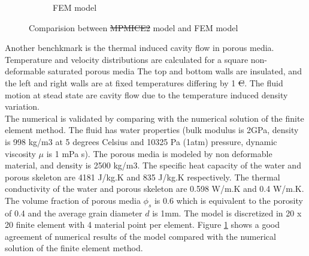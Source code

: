 \documentclass[preprint,12pt]{elsarticle}
\providecommand{\DIFadd}[1]{{\protect\color{blue}\uwave{#1}}} %
\providecommand{\DIFdel}[1]{{\protect\color{red}\sout{#1}}}                      %
\providecommand{\DIFaddbegin}{} %
\providecommand{\DIFaddend}{} %
\providecommand{\DIFdelbegin}{} %
\providecommand{\DIFdelend}{} %
\providecommand{\DIFaddFL}[1]{\DIFadd{#1}} %
\providecommand{\DIFdelFL}[1]{\DIFdel{#1}} %
\providecommand{\DIFaddbeginFL}{} %
\providecommand{\DIFaddendFL}{} %
\providecommand{\DIFdelbeginFL}{} %
\providecommand{\DIFdelendFL}{} %
\newcommand{\DIFscaledelfig}{0.5}
\newlength{\DIFdelgraphicswidth} %
\newlength{\DIFdelgraphicsheight} %
\newcommand{\DIFaddincludegraphics}[2][]{{\color{blue}\fbox{\DIFOincludegraphics[#1]{#2}}}} %
\newcommand{\DIFdelincludegraphics}[2][]{%
\sbox{\DIFdelgraphicsbox}{\DIFOincludegraphics[#1]{#2}}%
\settoboxwidth{\DIFdelgraphicswidth}{\DIFdelgraphicsbox} %
\settoboxtotalheight{\DIFdelgraphicsheight}{\DIFdelgraphicsbox} %
\scalebox{\DIFscaledelfig}{%
\parbox[b]{\DIFdelgraphicswidth}{\usebox{\DIFdelgraphicsbox}\\[-\baselineskip] \rule{\DIFdelgraphicswidth}{0em}}\llap{\resizebox{\DIFdelgraphicswidth}{\DIFdelgraphicsheight}{%
\setlength{\unitlength}{\DIFdelgraphicswidth}%
\begin{picture}(1,1)%
\thicklines\linethickness{2pt} %
{\color[rgb]{1,0,0}\put(0,0){\framebox(1,1){}}}%
{\color[rgb]{1,0,0}\put(0,0){\line( 1,1){1}}}%
{\color[rgb]{1,0,0}\put(0,1){\line(1,-1){1}}}%
\end{picture}%
}\hspace*{3pt}}} %
} %
\DeclareRobustCommand{\DIFaddbegin}{\DIFOaddbegin \let\includegraphics\DIFaddincludegraphics} %
\DeclareRobustCommand{\DIFaddend}{\DIFOaddend \let\includegraphics\DIFOincludegraphics} %
\DeclareRobustCommand{\DIFdelbegin}{\DIFOdelbegin \let\includegraphics\DIFdelincludegraphics} %
\DeclareRobustCommand{\DIFdelend}{\DIFOaddend \let\includegraphics\DIFOincludegraphics} %
\DeclareRobustCommand{\DIFaddbeginFL}{\DIFOaddbeginFL \let\includegraphics\DIFaddincludegraphics} %
\DeclareRobustCommand{\DIFaddendFL}{\DIFOaddendFL \let\includegraphics\DIFOincludegraphics} %
\DeclareRobustCommand{\DIFdelbeginFL}{\DIFOdelbeginFL \let\includegraphics\DIFdelincludegraphics} %
\DeclareRobustCommand{\DIFdelendFL}{\DIFOaddendFL \let\includegraphics\DIFOincludegraphics} %
\begin{document}
\begin{figure}
\begin{subfigure}[d]{0.5\linewidth}
\caption{FEM model \DIFaddbeginFL \DIFaddFL{\mbox{%
\cite{Ali}}\hspace{0pt}%
}\DIFaddendFL }
\end{subfigure}
\caption{Comparision between \DIFdelbeginFL \DIFdelFL{MPMICE2 }\DIFdelendFL \DIFaddbeginFL \DIFaddFL{MPMICE }\DIFaddendFL model and FEM model}
\label{fig:thermal}
\end{figure}
%
%
Another benchkmark is the thermal induced cavity flow in porous media. Temperature and velocity distributions are calculated for a square non-deformable saturated porous media The top and bottom walls are insulated, and the left and right walls are at fixed temperatures differing by 1 \DIFdelbegin \DIFdel{C}\DIFdelend \DIFaddbegin \DIFadd{degree}\DIFaddend . The fluid motion at stead state are cavity flow due to the temperature induced density variation. \\
The numerical is validated by comparing with the numerical solution of the finite element method. The fluid has water properties (bulk modulus is 2GPa, density is 998 kg/m3 at 5 degrees Celsius and 10325 Pa (1atm) pressure, dynamic viscosity $\mu$ is 1 mPa s). The porous media is modeled by non deformable material, and density is 2500 kg/m3. The specific heat capacity of the water and porous skeleton are 4181 J/kg.K and 835 J/kg.K respectively. The thermal conductivity of the water and porous skeleton are 0.598 W/m.K and 0.4 W/m.K. The volume fraction of porous media $\phi_s$ is 0.6 which is equivalent to the porosity of 0.4 and the average grain diameter $d$ is 1mm. The model is discretized in 20 x 20 finite element with 4 material point per element. Figure \ref{fig:thermal} shows a good agreement of numerical results of the model compared with the numerical solution of the finite element method. \\
\end{document}
